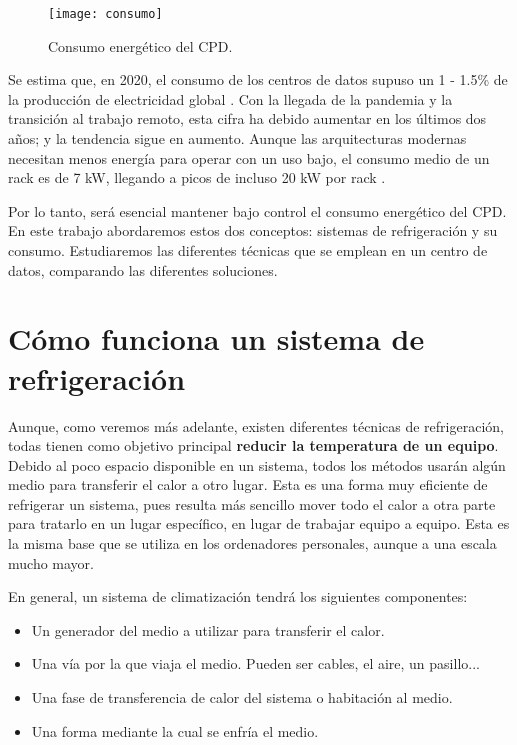\begin{figure}
    \begin{center}
    \caption{Consumo energético del CPD.}
    \label{consumo_energetico}
    \texttt{[image: consumo]}
    \end{center}
\end{figure}

Se estima que, en 2020, el consumo de los centros de datos supuso un 1 - 1.5\% de la producción de electricidad global \cite{mytton-dc}. Con la llegada de la pandemia y la transición al trabajo remoto, esta cifra ha debido aumentar en los últimos dos años; y la tendencia sigue en aumento. Aunque las arquitecturas modernas necesitan menos energía para operar con un uso bajo, el consumo medio de un rack es de 7 kW, llegando a picos de incluso 20 kW por rack \cite{datacenters-density}.

Por lo tanto, será esencial mantener bajo control el consumo energético del CPD. En este trabajo abordaremos estos dos conceptos: sistemas de refrigeración y su consumo. Estudiaremos las diferentes técnicas que se emplean en un centro de datos, comparando las diferentes soluciones.

\section{Cómo funciona un sistema de refrigeración}

Aunque, como veremos más adelante, existen diferentes técnicas de refrigeración, todas tienen como objetivo principal \textbf{reducir la temperatura de un equipo}. Debido al poco espacio disponible en un sistema, todos los métodos usarán algún medio para transferir el calor a otro lugar. Esta es una forma muy eficiente de refrigerar un sistema, pues resulta más sencillo mover todo el calor a otra parte para tratarlo en un lugar específico, en lugar de trabajar equipo a equipo. Esta es la misma base que se utiliza en los ordenadores personales, aunque a una escala mucho mayor.

En general, un sistema de climatización tendrá los siguientes componentes:

\begin{itemize}
    \item Un generador del medio a utilizar para transferir el calor.
    \item Una vía por la que viaja el medio. Pueden ser cables, el aire, un pasillo...
    \item Una fase de transferencia de calor del sistema o habitación al medio.
    \item Una forma mediante la cual se enfría el medio.
\end{itemize}

